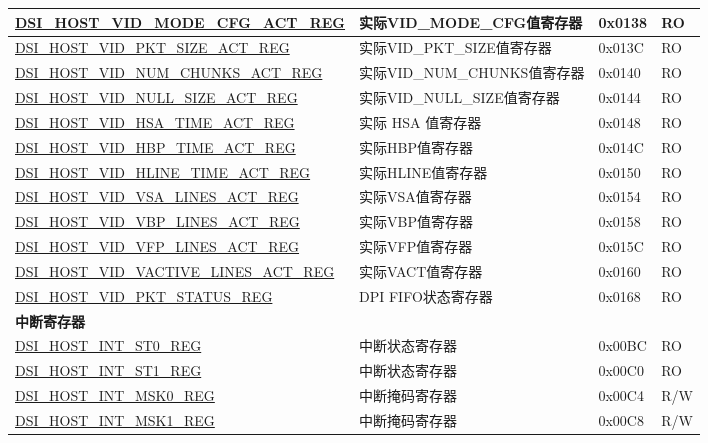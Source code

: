 \begin{longtable}{ | p{6.8cm} | p{6.5cm} | p{1.2cm} | p{1cm} | }
\hyperref[regdesc:DSIHOSTVIDMODECFGACTREG]{DSI\_HOST\_VID\_MODE\_CFG\_ACT\_REG} & 实际VID\_MODE\_CFG值寄存器 & 0x0138 & RO \\ \hline
\hyperref[regdesc:DSIHOSTVIDPKTSIZEACTREG]{DSI\_HOST\_VID\_PKT\_SIZE\_ACT\_REG} & 实际VID\_PKT\_SIZE值寄存器 & 0x013C & RO \\ \hline
\hyperref[regdesc:DSIHOSTVIDNUMCHUNKSACTREG]{DSI\_HOST\_VID\_NUM\_CHUNKS\_ACT\_REG} & 实际VID\_NUM\_CHUNKS值寄存器 & 0x0140 & RO \\ \hline
\hyperref[regdesc:DSIHOSTVIDNULLSIZEACTREG]{DSI\_HOST\_VID\_NULL\_SIZE\_ACT\_REG} & 实际VID\_NULL\_SIZE值寄存器 & 0x0144 & RO \\ \hline
\hyperref[regdesc:DSIHOSTVIDHSATIMEACTREG]{DSI\_HOST\_VID\_HSA\_TIME\_ACT\_REG} & 实际 HSA 值寄存器 & 0x0148 & RO \\ \hline
\hyperref[regdesc:DSIHOSTVIDHBPTIMEACTREG]{DSI\_HOST\_VID\_HBP\_TIME\_ACT\_REG} & 实际HBP值寄存器 & 0x014C & RO \\ \hline
\hyperref[regdesc:DSIHOSTVIDHLINETIMEACTREG]{DSI\_HOST\_VID\_HLINE\_TIME\_ACT\_REG} & 实际HLINE值寄存器 & 0x0150 & RO \\ \hline
\hyperref[regdesc:DSIHOSTVIDVSALINESACTREG]{DSI\_HOST\_VID\_VSA\_LINES\_ACT\_REG} & 实际VSA值寄存器 & 0x0154 & RO \\ \hline
\hyperref[regdesc:DSIHOSTVIDVBPLINESACTREG]{DSI\_HOST\_VID\_VBP\_LINES\_ACT\_REG} & 实际VBP值寄存器 & 0x0158 & RO \\ \hline
\hyperref[regdesc:DSIHOSTVIDVFPLINESACTREG]{DSI\_HOST\_VID\_VFP\_LINES\_ACT\_REG} & 实际VFP值寄存器 & 0x015C & RO \\ \hline
\hyperref[regdesc:DSIHOSTVIDVACTIVELINESACTREG]{DSI\_HOST\_VID\_VACTIVE\_LINES\_ACT\_REG} & 实际VACT值寄存器 & 0x0160 & RO \\ \hline
\hyperref[regdesc:DSIHOSTVIDPKTSTATUSREG]{DSI\_HOST\_VID\_PKT\_STATUS\_REG} & DPI FIFO状态寄存器 & 0x0168 & RO \\ \hline
\multicolumn{4}{|l|}{\textbf{中断寄存器}} \\ \hline
\hyperref[regdesc:DSIHOSTINTST0REG]{DSI\_HOST\_INT\_ST0\_REG} & 中断状态寄存器 & 0x00BC & RO \\ \hline
\hyperref[regdesc:DSIHOSTINTST1REG]{DSI\_HOST\_INT\_ST1\_REG} & 中断状态寄存器 & 0x00C0 & RO \\ \hline
\hyperref[regdesc:DSIHOSTINTMSK0REG]{DSI\_HOST\_INT\_MSK0\_REG} & 中断掩码寄存器 & 0x00C4 & R/W \\ \hline
\hyperref[regdesc:DSIHOSTINTMSK1REG]{DSI\_HOST\_INT\_MSK1\_REG} & 中断掩码寄存器 & 0x00C8 & R/W \\ \hline
\end{longtable}
